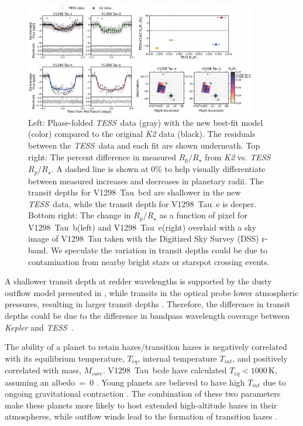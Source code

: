 \documentclass[linenumbers,twocolumn]{aastex631}
\newcommand{\githubicon}{{\color{black}\faGithub}}
\newcommand{\tess}{\textit{TESS}}
\newcommand{\sname}{V1298~Tau\xspace}
\newcommand{\allplanets}{V1298~Tau~bcde\xspace}
\newcommand{\planetb}{V1298~Tau~b\xspace}
\newcommand{\planete}{V1298~Tau~e\xspace}
\newcommand{\planetknown}{V1298~Tau~bcd\xspace}
\begin{document}
\begin{figure}[!htb]
\begin{center}
\includegraphics[width=0.9\textwidth,trim={0.25cm 0 0 0}]{static/compare_together.pdf}
\caption{Left: Phase-folded \tess\ data (gray) with the new best-fit model (color) compared to the original \textit{K2} data (black). The residuals between the \tess\ data and each fit are shown underneath. Top right: The percent difference in measured $R_p/R_\star$ from \textit{K2} vs. \tess\ $R_p/R_\star$. A dashed line is shown at 0\% to help visually differentiate between measured increases and decreases in planetary radii. The transit depths for \planetknown are shallower in the new \tess\ data, while the transit depth for \planete is deeper. Bottom right: The change in $R_p/R_\star$ as a function of pixel for \planetb (left) and \planete (right) overlaid with a sky image of \sname taken with the Digitized Sky Survey (DSS) r-band. We speculate the variation in transit depths could be due to contamination from nearby bright stars or starspot crossing events. \href{https://github.com/afeinstein20/v1298tau_tess/blob/main/src/figures/dilution_check.py}{\githubicon}} \label{fig:compare}
\end{center}
\end{figure}

A shallower transit depth at redder wavelengths is supported by the dusty outflow model presented in \cite{wang19}, while transits in the optical probe lower atmospheric pressures, resulting in larger transit depths \citep{gao20}. Therefore, the difference in transit depths could be due to the difference in bandpass wavelength coverage between \textit{Kepler} \citep[400-900~nm;][]{Howell2014} and \tess\ \citep[600-1000~nm;][]{Ricker2015}. 

The ability of a planet to retain hazes/transition hazes is negatively correlated with its equilibrium temperature, $T_{eq}$, internal temperature $T_{int}$, and positively correlated with mass, $M_{core}$. \allplanets have calculated $T_{eq} < 1000$\,K, assuming an albedo~=~0 \citep{David2019a}. Young planets are believed to have high $T_{int}$ due to ongoing gravitational contraction \citep{gu04}. The combination of these two parameters make these planets more likely to host extended high-altitude hazes in their atmospheres, while outflow winds lead to the formation of transition hazes \citep{gao20}. 
\end{document}
